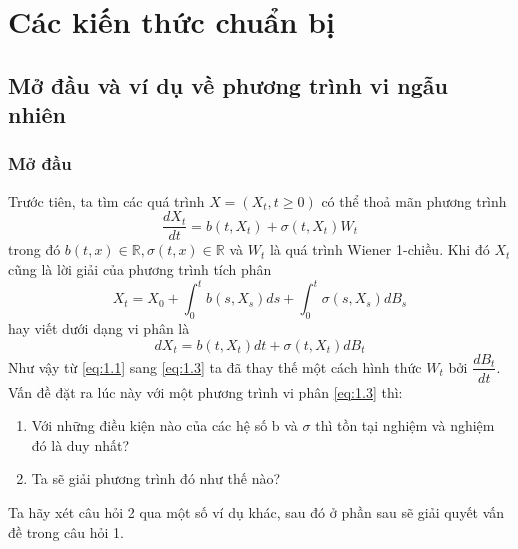 \documentclass[14pt,a4paper]{article}
\numberwithin{equation}{section}
\begin{document}
\renewcommand\thesection{\Roman{section}}
\renewcommand\thesubsection{\arabic{subsection}}
\renewcommand\thesubsubsection{\thesubsection.\arabic{subsubsection}}


\section{Các kiến thức chuẩn bị}
\subsection{Mở đầu và ví dụ về phương trình vi ngẫu nhiên}
\subsubsection{Mở đầu}
Trước tiên, ta tìm các quá trình $X=(X_t,t\geq 0)$ có thể thoả mãn phương trình
\begin{equation}\label{eq:1.1}
	\dfrac{dX_t}{dt}=b(t,X_t)+\sigma(t,X_t)W_t
\end{equation}
trong đó $b(t,x)\in\mathbb{R},\sigma(t,x)\in\mathbb{R}$ và $W_t$ là quá trình Wiener 1-chiều. Khi đó $X_t$ cũng là lời giải của phương trình tích phân
\begin{equation}\label{eq:1.2}
	X_t=X_0+\int_0^tb(s,X_s)ds+\int_0^t\sigma(s,X_s)dB_s
\end{equation}
hay viết dưới dạng vi phân là
\begin{equation}\label{eq:1.3}
	dX_t=b(t,X_t)dt+\sigma(t,X_t)dB_t
\end{equation}
Như vậy từ \eqref{eq:1.1} sang \eqref{eq:1.3} ta đã thay thế một cách hình thức $W_t$ bởi $\dfrac{dB_t}{dt}$. Vấn đề đặt ra lúc này với một phương trình vi phân \eqref{eq:1.3} thì:
\begin{enumerate}[(1)]
	\item Với những điều kiện nào của các hệ số b và $\sigma$ thì tồn tại nghiệm và nghiệm đó là duy nhất?
	\item Ta sẽ giải phương trình đó như thế nào?
\end{enumerate}
Ta hãy xét câu hỏi 2 qua một số ví dụ khác, sau đó ở phần sau sẽ giải quyết vấn đề trong câu hỏi 1.
\end{document}
